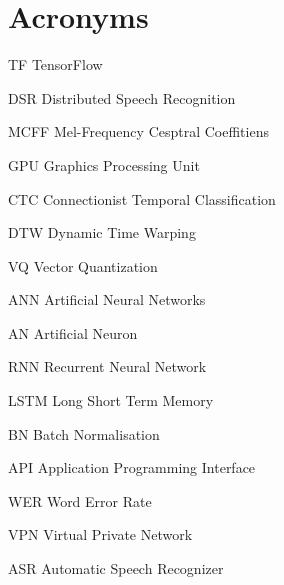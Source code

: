 \chapter*{Acronyms}\label{ch:acronyms}

\newcommand{\abbrlabel}[1]{\makebox[3cm][l]{\textbf{#1}\ \dotfill}}
\newenvironment{abbreviations}{\begin{list}{}{\renewcommand{\makelabel}{\abbrlabel}}}{\end{list}}

\begin{abbreviations}
	\item[TF] TensorFlow
	\item[DSR] Distributed Speech Recognition
	\item[MCFF] Mel-Frequency Cesptral Coeffitiens
	\item[GPU] Graphics Processing Unit
	\item[CTC] Connectionist Temporal Classification
	\item[DTW] Dynamic Time Warping
	\item[VQ] Vector Quantization
	\item[ANN] Artificial Neural Networks
	\item[AN] Artificial Neuron
	\item[RNN] Recurrent Neural Network
	\item[LSTM] Long Short Term Memory
	\item[BN] Batch Normalisation
	\item[API] Application Programming Interface
	\item[WER] Word Error Rate
	\item[VPN] Virtual Private Network
	\item[ASR] Automatic Speech Recognizer
\end{abbreviations}